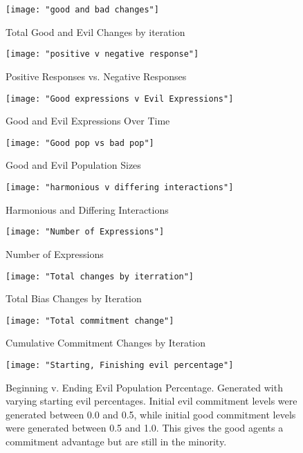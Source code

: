 \documentclass[]{article}
\begin{document}
\newpage

\begin{figure}
	\centering
	\texttt{[image: "good and bad changes"]}
	\caption{Total Good and Evil Changes by iteration}
	\label{fig:good and bad changes}
\end{figure}

\begin{figure}
	\centering
	\texttt{[image: "positive v negative response"]}
	\caption{Positive Responses vs. Negative Responses}
	\label{fig:positivevnegativeresponse}
\end{figure}

\begin{figure}
	\centering
	\texttt{[image: "Good expressions v Evil Expressions"]}
	\caption{Good and Evil Expressions Over Time}
	\label{fig:good v evil expressions}
\end{figure}

\begin{figure}
	\centering
	\texttt{[image: "Good pop vs bad pop"]}
	\caption{Good and Evil Population Sizes}
	\label{fig:good v evil pop sizes}
\end{figure}

\begin{figure}
	\centering
	\texttt{[image: "harmonious v differing interactions"]}
	\caption{Harmonious and Differing Interactions}
	\label{fig:harmonious v differing}
\end{figure} 

\begin{figure}
	\centering
	\texttt{[image: "Number of Expressions"]}
	\caption{Number of Expressions}
	\label{fig:expressions}
\end{figure} 

\begin{figure}
	\centering
	\texttt{[image: "Total changes by iterration"]}
	\caption{Total Bias Changes by Iteration}
	\label{fig:changes by iteration}
\end{figure} 

\begin{figure}
	\centering
	\texttt{[image: "Total commitment change"]}
	\caption{Cumulative Commitment Changes by Iteration}
	\label{fig:commitment changes}
\end{figure} 

\begin{figure}
	\centering
	\texttt{[image: "Starting, Finishing evil percentage"]}
	\caption{Beginning v. Ending Evil Population Percentage. Generated with varying starting evil percentages. Initial evil commitment levels were generated between 0.0 and 0.5, while initial good commitment levels were generated between 0.5 and 1.0. This gives the good agents a commitment advantage but are still in the minority.}
	\label{fig:evil v evil}
	
\end{figure}
\end{document}
